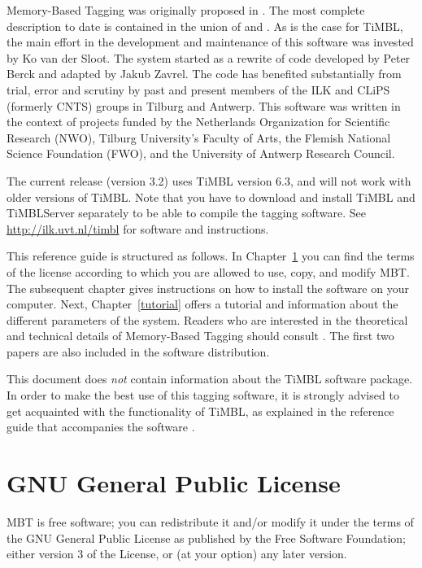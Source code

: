 \documentclass{report}
\begin{document}
Memory-Based Tagging was originally proposed in
\cite{Daelemans95}. The most complete description to date is contained
in the union of \cite{Daelemans+96} and \cite{Zavrel+99}.  As is the
case for TiMBL, the main effort in the development and
maintenance of this software was invested by Ko van der Sloot. The
system started as a rewrite of code developed by Peter Berck and
adapted by Jakub Zavrel. The code has benefited substantially from
trial, error and scrutiny by past and present members of the ILK
and CLiPS (formerly CNTS) groups in Tilburg and Antwerp. This software was
written in the context of projects funded by the Netherlands
Organization for Scientific Research (NWO), Tilburg University's Faculty
of Arts, the Flemish National Science Foundation (FWO), and the
University of Antwerp Research Council.

The current release (version 3.2) uses TiMBL version 6.3, and will not
work with older versions of TiMBL. Note that you have to download
and install TiMBL and TiMBLServer separately to be able to compile the tagging
software. See \url{http://ilk.uvt.nl/timbl} for software and instructions.

This reference guide is structured as follows. In
Chapter~\ref{license} you can find the terms of the license according
to which you are allowed to use, copy, and modify MBT. The subsequent
chapter gives instructions on how to install the software on your
computer.  Next, Chapter~\ref{tutorial} offers a tutorial and
information about the different parameters of the system.  Readers who
are interested in the theoretical and technical details of
Memory-Based Tagging should consult
\cite{Daelemans+96,Zavrel+99,Daelemans+05}. The first two papers are
also included in the software distribution.

This document does {\em not}\/ contain information about the TiMBL
software package. In order to make the best use of this tagging
software, it is strongly advised to get acquainted with the
functionality of TiMBL, as explained in the reference guide that
accompanies the software \cite{Daelemans+07}.

\chapter{GNU General Public License}
\label{license}

MBT is free software; you can redistribute it and/or modify it under
the terms of the GNU General Public License as published by the Free
Software Foundation; either version 3 of the License, or (at your
option) any later version.
\end{document}
